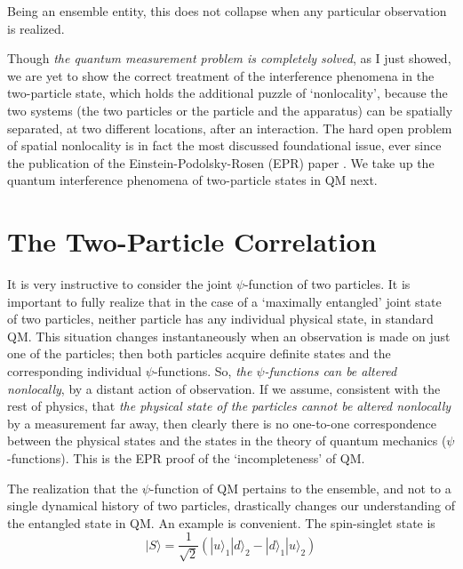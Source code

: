 Being an ensemble entity, this does not collapse when any particular observation is realized.

Though \textit{the quantum measurement problem is completely solved}, as I just showed, we are
yet to show the correct treatment of the interference phenomena in the two-particle state,
which holds the additional puzzle of `nonlocality', because the two systems (the two particles
or the particle and the apparatus) can be spatially separated, at two different locations, after
an interaction. The hard open problem of spatial nonlocality is in fact the most discussed
foundational issue, ever since the publication of the Einstein-Podolsky-Rosen (EPR) paper
\cite{chap14-key9}. We take up the quantum interference phenomena of two-particle states in QM next.

\section{The Two-Particle Correlation}\label{c14-sec7}

It is very instructive to consider the joint $\psi$-function of two particles. It is important
to fully realize that in the case of a `maximally entangled' joint state of two particles,
neither particle has any individual physical state, in standard QM. This situation changes
instantaneously when an observation is made on just one of the particles; then both particles
acquire definite states and the corresponding individual $\psi$-functions. So, \textit{the $\psi$-functions
can be altered nonlocally}, by a distant action of observation. If we assume, consistent with
the rest of physics, that \textit{the physical state of the particles cannot be altered nonlocally} by
a measurement far away, then clearly there is no one-to-one correspondence between the
physical states and the states in the theory of quantum mechanics ($\psi$-functions). This is
the EPR proof of the `incompleteness' of QM.

The realization that the $\psi$-function of QM pertains to the ensemble, and not to a single dynamical history of two
particles, drastically changes our understanding of the entangled state in QM. An example
is convenient. The spin-singlet state is
\begin{equation*}
|S\rangle = \frac{1}{\sqrt{2}} (|u \rangle_1 | d \rangle_2 - | d \rangle_1 |u\rangle_2) \tag{32}\label{c14-eq32}
\end{equation*}


